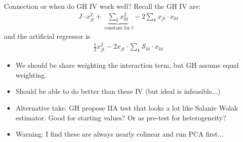 \begin{frame}{Connection or when do GH IV work well?}
Recall the GH IV are:
\begin{align*}
J \cdot x_{jt}^2 + \underbrace{\sum_k x_{kt}^2}_{\text{ constant for } t } - 2 \sum_k x_{jt} \cdot x_{kt}
\end{align*}
and the artificial regressor is
\begin{align*}
\frac{1}{2} x_{jt}^2 - 2 x_{jt} \cdot \sum_k \mathcal{S}_{kt}  \cdot x_{kt}
\end{align*}
\begin{itemize}
\item We should be \alert{share weighting} the interaction term, but GH assume equal weighting.\\
\item Should be able to do better than these IV (but ideal is infeasible...)
\item Alternative take: GH propose IIA test that looks a lot like Salanie Wolak estimator. Good for starting values? Or as pre-test for heterogeneity?
\item Warning: I find these are always nearly colinear and run PCA first...
\end{itemize}
\end{frame}









